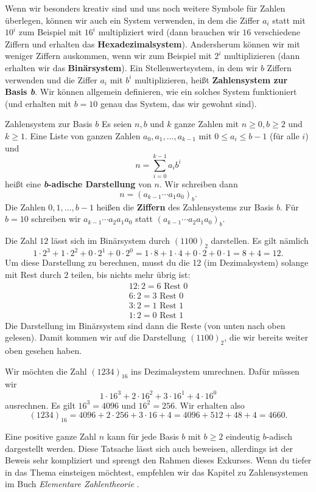 \documentclass[../../main.tex]{subfiles}
\begin{document}
Wenn wir besonders kreativ sind und uns noch weitere Symbole für Zahlen überlegen, können wir auch ein System verwenden, in dem die Ziffer $a_i$ statt mit $10^i$ zum Beispiel mit $16^i$ multipliziert wird (dann brauchen wir $16$ verschiedene Ziffern und erhalten das \textbf{Hexadezimalsystem}). Andersherum können wir mit weniger Ziffern auskommen, wenn wir zum Beispiel mit $2^i$ multiplizieren (dann erhalten wir das \textbf{Binärsystem}). Ein Stellenwertsystem, in dem wir $b$ Ziffern verwenden und die Ziffer $a_i$ mit $b^i$ multiplizieren, heißt \textbf{Zahlensystem zur Basis \emph{b}}. Wir können allgemein definieren, wie ein solches System funktioniert (und erhalten mit $b=10$ genau das System, das wir gewohnt sind).
\begin{definition}{Zahlensystem zur Basis $b$}
    Es seien $n,b$ und $k$ ganze Zahlen mit $n\geq 0, b\geq 2$ und $k\geq 1$. Eine Liste von ganzen Zahlen $a_0,a_1,\dots,a_{k-1}$ mit $0\leq a_i\leq b-1$ (für alle $i$) und
    \[n=\sum_{i=0}^{k-1}a_ib^i\]
    heißt eine \textbf{\emph{b}-adische Darstellung} von $n$. Wir schreiben dann
    \[n=(a_{k-1}\cdots a_1a_0)_b.\]
    Die Zahlen $0,1,\dots,b-1$ heißen die \textbf{Ziffern} des Zahlensystems zur Basis $b$. Für $b=10$ schreiben wir $a_{k-1}\cdots a_2a_1a_0$ statt $(a_{k-1}\cdots a_2a_1a_0)_b$.
\end{definition}
\begin{example}{}
    Die Zahl $12$ lässt sich im Binärsystem durch $(1100)_2$ darstellen. Es gilt nämlich
    \[1\cdot 2^3+1\cdot 2^2+0\cdot 2^1+0\cdot 2^0=1\cdot 8+1\cdot 4+0\cdot 2+0\cdot 1=8+4=12.\]
    Um diese Darstellung zu berechnen, musst du die 12 (im Dezimalsystem) solange mit Rest durch $2$ teilen, bis nichts mehr übrig ist: 
    \begin{align*}
        12:2=6\text{ Rest }0\\
        6:2=3\text{ Rest }0\\
        3:2=1\text{ Rest }1\\
        1:2=0\text{ Rest }1
    \end{align*}
    Die Darstellung im Binärsystem sind dann die Reste (von unten nach oben gelesen). Damit kommen wir auf die Darstellung $(1100)_2$, die wir bereits weiter oben gesehen haben.
\end{example}
\begin{example}[ex:hexadezimal]{}
    Wir möchten die Zahl $(1234)_{16}$ ins Dezimalsystem umrechnen. Dafür müssen wir
    \[1\cdot 16^3+2\cdot 16^2+3\cdot 16^1+4\cdot 16^0\]
    ausrechnen. Es gilt $16^3=4096$ und $16^2=256$. Wir erhalten also
    \[(1234)_{16}=4096+2\cdot 256+3\cdot 16+4=4096+512+48+4=4660.\]
\end{example}
Eine positive ganze Zahl $n$ kann für jede Basis $b$ mit $b\geq 2$ eindeutig $b$-adisch dargestellt werden. Diese Tatsache lässt sich auch beweisen, allerdings ist der Beweis sehr kompliziert und sprengt den Rahmen dieses Exkurses. Wenn du tiefer in das Thema einsteigen möchtest, empfehlen wir das Kapitel zu Zahlensystemen im Buch \emph{Elementare Zahlentheorie} \cite{todo}.
\end{document}
